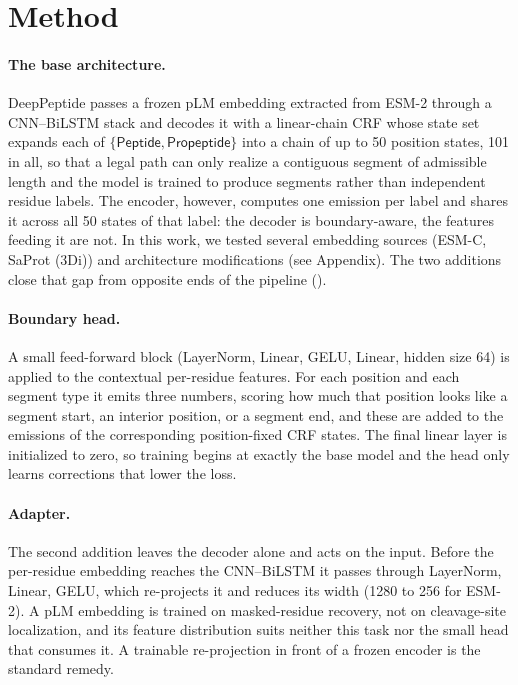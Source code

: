 \documentclass{article}
\begin{document}
\section{Method}
\label{sec:method}

\paragraph{The base architecture.} DeepPeptide passes a frozen pLM embedding extracted from ESM-2 through a CNN--BiLSTM stack and decodes it with a linear-chain CRF whose state set expands each of $\{\textsf{Peptide}, \textsf{Propeptide}\}$ into a chain of up to 50 position states, 101 in all, so that a legal path can only realize a contiguous segment of admissible length and the model is trained to produce segments rather than independent residue labels. The encoder, however, computes one emission per label and shares it across all 50 states of that label: the decoder is boundary-aware, the features feeding it are not. In this work, we tested several embedding sources (ESM-C, SaProt (3Di)) and architecture modifications (see Appendix).
The two additions close that gap from opposite ends of the pipeline ().


\paragraph{Boundary head.} A small feed-forward block (LayerNorm, Linear, GELU, Linear, hidden size 64) is applied to the contextual per-residue features. For each position and each segment type it emits three numbers, scoring how much that position looks like a segment start, an interior position, or a segment end, and these are added to the emissions of the corresponding position-fixed CRF states. The final linear layer is initialized to zero, so training begins at exactly the base model and the head only learns corrections that lower the loss. 

\paragraph{Adapter.} The second addition leaves the decoder alone and acts on the input. Before the per-residue embedding reaches the CNN--BiLSTM it passes through LayerNorm, Linear, GELU, which re-projects it and reduces its width (1280 to 256 for ESM-2). A pLM embedding is trained on masked-residue recovery, not on cleavage-site localization, and its feature distribution suits neither this task nor the small head that consumes it. A trainable re-projection in front of a frozen encoder is the standard remedy. 
\end{document}
